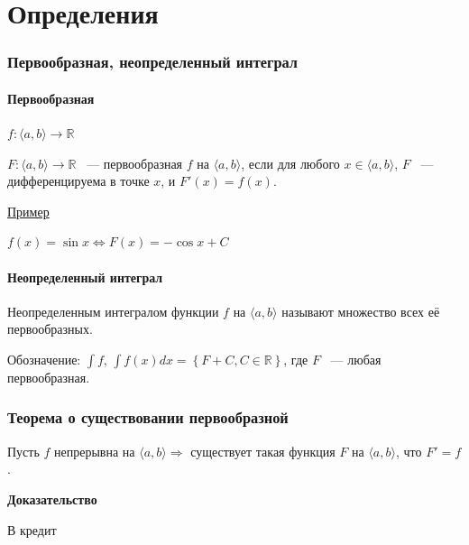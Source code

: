 \documentclass{article}
\begin{document}
\newcommand{\PG}[0]{\Pi\Gamma}

\tableofcontents

\newpage

\part{Определения}

	\newpage
	
	\section{Первообразная, неопределенный интеграл}
	
		\subsection{Первообразная}
	
			$f: \langle a, b \rangle \rightarrow \mathbb{R}$
	
			$F: \langle a, b \rangle \rightarrow \mathbb{R}$ ~--- первообразная $f$ на $\langle a, b \rangle$, если для любого $x \in \langle a, b \rangle$, $F$ ~--- дифференцируема в точке $x$, и $F'(x) = f(x)$.
	
			\underline{Пример}
	
			$f(x) = \sin{x} \Leftrightarrow F(x) = -\cos{x} + C$
	
		\subsection{Неопределенный интеграл}
	
			Неопределенным интегралом функции $f$ на $\langle a, b \rangle$ называют множество всех её первообразных.
			
			Обозначение: $\int{f}$, $\int{f(x) dx} = \left\{ F + C, C \in \mathbb{R} \right\}$, где $F$ ~--- любая первообразная.
		
	\newpage
		
	\section{Теорема о существовании первообразной}
		
		Пусть $f$ непрерывна на $\langle a, b \rangle \Rightarrow$ существует такая функция $F$ на $\langle a, b \rangle$, что $F' = f$.
		
		\textbf{Доказательство}
			
		В кредит
			
	\newpage
		
\end{document}
